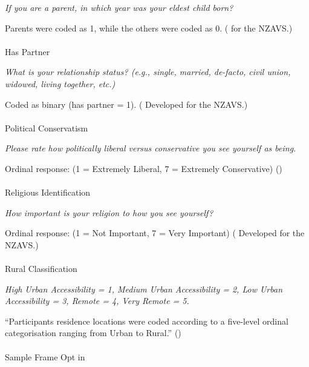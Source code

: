 \documentclass[
  single column]{article}
\makeatletter
\let\oldparagraph\paragraph
\renewcommand{\paragraph}{
    \@ifstar
      \xxxParagraphStar
      \xxxParagraphNoStar
  }
\newcommand{\xxxParagraphStar}[1]{\oldparagraph*{#1}\mbox{}}
\newcommand{\xxxParagraphNoStar}[1]{\oldparagraph{#1}\mbox{}}
\makeatother
\begin{document}
\emph{If you are a parent, in which year was your eldest child born?}

Parents were coded as 1, while the others were coded as 0.
( for the NZAVS.)

\paragraph{Has Partner}\label{has-partner}

\emph{What is your relationship status? (e.g., single, married,
de-facto, civil union, widowed, living together, etc.)}

Coded as binary (has partner = 1).
( Developed for the
NZAVS.)

\paragraph{Political Conservatism}\label{political-conservatism}

\emph{Please rate how politically liberal versus conservative you see
yourself as being.}

Ordinal response: (1 = Extremely Liberal, 7 = Extremely Conservative)
()

\paragraph{Religious Identification}\label{religious-identification}

\emph{How important is your religion to how you see yourself?}

Ordinal response: (1 = Not Important, 7 = Very Important)
( Developed for the
NZAVS.)

\paragraph{Rural Classification}\label{rural-classification}

\emph{High Urban Accessibility = 1, Medium Urban Accessibility = 2, Low
Urban Accessibility = 3, Remote = 4, Very Remote = 5.}

``Participants residence locations were coded according to a five-level
ordinal categorisation ranging from Urban to Rural.''
()

\paragraph{Sample Frame Opt in}\label{sample-frame-opt-in}
\end{document}
